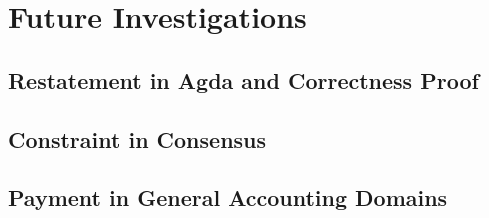 \documentclass[a4paper]{report}
\begin{document}
\chapter{Future Investigations}

\section{Restatement in Agda and Correctness Proof}

\section{Constraint in Consensus}

\section{Payment in General Accounting Domains}

\newpage
\printbibliography{}
\end{document}
